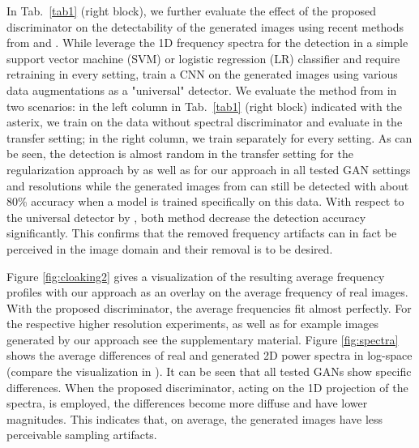 \documentclass[letterpaper]{article} %
\begin{document}
In Tab.~\ref{tab1} (right block), we further evaluate the effect of the proposed discriminator on the detectability of the generated images using recent methods from \citet{margret2020upconvolution} and \citet{Wang_2020_CVPR}. 
While \citet{margret2020upconvolution} leverage the 1D frequency spectra for the detection in a simple support vector machine (SVM) or logistic regression (LR) classifier and require retraining in every setting, \citet{Wang_2020_CVPR} train a CNN on the generated images using various data augmentations as a "universal" detector. We evaluate the method from \citet{margret2020upconvolution} in two scenarios: in the left column in Tab.~\ref{tab1} (right block) indicated with the asterix, we train on the data without spectral discriminator and evaluate in the transfer setting; in the right column, we train separately for every setting.
As can be seen, the detection is almost random in the transfer setting for the regularization approach by \citet{margret2020upconvolution} as well as for our approach in all tested GAN settings and resolutions while the generated images from \cite{margret2020upconvolution} can still be detected with about 80\% accuracy when a model is trained specifically on this data.
With respect to the universal detector by \citet{Wang_2020_CVPR}, both method decrease the detection accuracy significantly. This confirms that the removed frequency artifacts can in fact be perceived in the image domain and their removal is to be desired.

Figure \ref{fig:cloaking2} gives a visualization of the resulting average frequency profiles with our approach as an overlay on the average frequency of real images. With the proposed discriminator, the average frequencies fit almost perfectly. For the respective higher resolution experiments, as well as for example images generated by our approach see the supplementary material. Figure \ref{fig:spectra} shows the average differences of real and generated 2D power spectra in log-space (compare the visualization in \cite{Wang_2020_CVPR}). It can be seen that all tested GANs show specific differences. When the proposed discriminator, acting on the 1D projection of the spectra, is employed, the differences become more diffuse and have lower magnitudes. This indicates that, on average, the generated images have less perceivable sampling artifacts.  %
\end{document}
